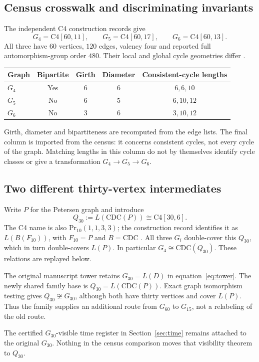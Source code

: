 \subsection*{Census crosswalk and discriminating invariants}
The independent C4 construction records give
\[
G_4=\mathrm{C4}[60,11],\qquad
G_5=\mathrm{C4}[60,17],\qquad
G_6=\mathrm{C4}[60,13].
\]
All three have $60$ vertices, $120$ edges, valency four and reported full automorphism-group order $480$. Their local and global cycle geometries differ \citep{c46011,c46017,c46013}.
\begin{center}
\begin{tabular}{@{}lcccc@{}}
\toprule
Graph & Bipartite & Girth & Diameter & Consistent-cycle lengths\\
\midrule
$G_4$ & Yes & 6 & 6 & $6,6,10$\\
$G_5$ & No & 6 & 5 & $6,10,12$\\
$G_6$ & No & 3 & 6 & $3,10,12$\\
\bottomrule
\end{tabular}
\end{center}
Girth, diameter and bipartiteness are recomputed from the edge lists. The final column is imported from the census: it concerns consistent cycles, not every cycle of the graph. Matching lengths in this column do not by themselves identify cycle classes or give a transformation $G_4\to G_5\to G_6$.

\subsection*{Two different thirty-vertex intermediates}
Write $P$ for the Petersen graph and introduce
\begin{equation}
Q_{30}:=L(\mathrm{CDC}(P))\cong\mathrm{C4}[30,6].
\tag{F2}\label{eq:common30}
\end{equation}
The C4 name is also $\mathrm{Pr}_{10}(1,1,3,3)$; the construction record identifies it as $L(B(F_{10}))$, with $F_{10}=P$ and $B=\mathrm{CDC}$ \citep{c4306}. All three $G_i$ double-cover this $Q_{30}$, which in turn double-covers $L(P)$. In particular $G_4\cong\mathrm{CDC}(Q_{30})$. These relations are replayed below.

\begin{principle}[title={The two thirty-state graphs are not interchangeable}]
The original manuscript tower retains $G_{30}=L(D)$ in equation~\eqref{eq:tower}. The newly shared family base is $Q_{30}=L(\mathrm{CDC}(P))$. Exact graph isomorphism testing gives $Q_{30}\not\cong G_{30}$, although both have thirty vertices and cover $L(P)$. Thus the family supplies an additional route from $G_{60}$ to $G_{15}$, not a relabeling of the old route.
\end{principle}
The certified $G_{30}$-visible time register in Section~\ref{sec:time} remains attached to the original $G_{30}$. Nothing in the census comparison moves that visibility theorem to $Q_{30}$.
\endgroup
\setcounter{section}{2}
